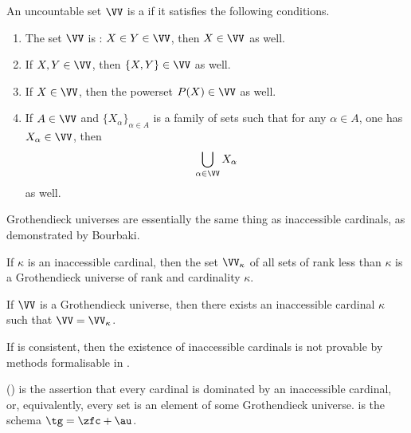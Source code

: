 \begin{definition}%
\label{dfn:uni}
	An uncountable set $\VV$ is a \cite[Exposé I, \S 0 and Appendix]{Anonymous:1972tk} if it satisfies the following conditions.
	\begin{enumerate}
		\item The set $\VV$ is : $X\in Y\in\VV$, then $X\in\VV$ as well.
		\item If $X,Y\in\VV$, then $\{X,Y\}\in\VV$ as well.
		\item If $X\in\VV$, then the powerset $P(X)\in\VV$ as well.
		\item If $A\in\VV$ and $\{X_{\alpha}\}_{\alpha\in A}$ is a family of sets such that for any $\alpha\in A$, one has $X_{\alpha}\in\VV$, then
		\[
		\bigcup_{\alpha\in\VV}X_{\alpha}
		\]
		as well.
	\end{enumerate}
\end{definition}

Grothendieck universes are essentially the same thing as inaccessible cardinals, as demonstrated by Bourbaki.\cite[Exposé I, Appendix]{Anonymous:1972tk}
\begin{proposition}[Bourbaki]
	If $\kappa$ is an inaccessible cardinal, then the set $\VV_{\kappa}$ of all sets of rank less than $\kappa$ is a Grothendieck universe of rank and cardinality $\kappa$.

	If $\VV$ is a Grothendieck universe, then there exists an inaccessible cardinal $\kappa$ such that $\VV=\VV_{\kappa}$.
\end{proposition}

\begin{theorem}
	If \zfc is consistent, then the existence of inaccessible cardinals is not provable by methods formalisable in \zfc.
\end{theorem}

\begin{axiom}%
\label{axm:AU}
	 (\au) is the assertion that every cardinal is dominated by an inaccessible cardinal, or, equivalently, every set is an element of some Grothendieck universe.
	 is the schema $\tg = \zfc+\au$.
\end{axiom}

